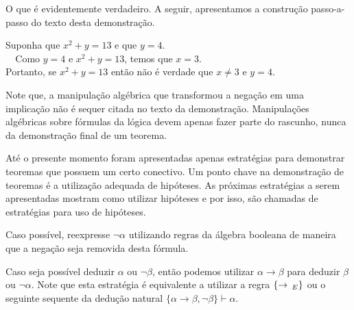 \begin{Example}
O que é evidentemente verdadeiro. A seguir, apresentamos a construção
passo-a-passo do texto desta demonstração.
\begin{flushleft}
Suponha que $x^2 + y = 13$ e que $y = 4$.\\
\verb|  |Como $y = 4$ e $x^2 + y = 13$, temos que $x = 3$.\\
Portanto, se $x^2 + y = 13$ então não é verdade que $x \neq 3$ e $y = 4$.
\end{flushleft}
Note que, a manipulação algébrica que transformou a negação em uma
implicação não é sequer citada no texto da demonstração. Manipulações
algébricas sobre fórmulas da lógica devem apenas fazer parte do
rascunho, nunca da demonstração final de um teorema.
\end{Example}

Até o presente momento foram apresentadas apenas estratégias para
demonstrar teoremas que possuem um certo conectivo. Um ponto chave na
demonstração de teoremas é a utilização adequada de hipóteses. As
próximas estratégias a serem apresentadas mostram como utilizar
hipóteses e por isso, são chamadas de estratégias para uso de
hipóteses.

\begin{HypothesisStrategy} Caso possível, reexpresse $\neg\alpha$ utilizando
  regras da álgebra booleana de maneira que a negação seja removida
  desta fórmula.
\end{HypothesisStrategy}

\begin{HypothesisStrategy} \label{imphyp1}
Caso seja possível deduzir  $\alpha$ ou $\neg \beta$, então
  podemos utilizar $\alpha\to\beta$ para deduzir $\beta$ ou
  $\neg\alpha$. Note que esta estratégia é equivalente a utilizar a
  regra $\scriptsize{\{\to\,_E\}}$ ou o seguinte sequente da dedução natural $\{\alpha\to\beta,\neg\beta\}\vdash\alpha$.
\end{HypothesisStrategy}

